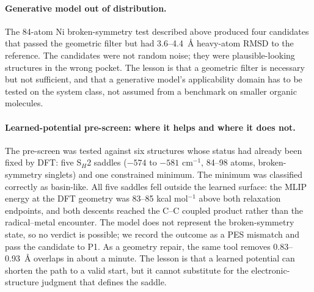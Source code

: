 \documentclass[11pt,a4paper]{article}
\begin{document}
\paragraph{Generative model out of distribution.}
The 84-atom Ni broken-symmetry test described above produced four candidates that passed the geometric filter but had 3.6--4.4~\AA{} heavy-atom RMSD to the reference. The candidates were not random noise; they were plausible-looking structures in the wrong pocket. The lesson is that a geometric filter is necessary but not sufficient, and that a generative model's applicability domain has to be tested on the system class, not assumed from a benchmark on smaller organic molecules.

\paragraph{Learned-potential pre-screen: where it helps and where it does not.}
The pre-screen was tested against six structures whose status had already been fixed by DFT: five S$_H$2 saddles ($-574$ to $-581$ cm$^{-1}$, 84--98 atoms, broken-symmetry singlets) and one constrained minimum. The minimum was classified correctly as basin-like. All five saddles fell outside the learned surface: the MLIP energy at the DFT geometry was 83--85 kcal mol$^{-1}$ above both relaxation endpoints, and both descents reached the C--C coupled product rather than the radical--metal encounter. The model does not represent the broken-symmetry state, so no verdict is possible; we record the outcome as a PES mismatch and pass the candidate to P1. As a geometry repair, the same tool removes 0.83--0.93~\AA{} overlaps in about a minute. The lesson is that a learned potential can shorten the path to a valid start, but it cannot substitute for the electronic-structure judgment that defines the saddle.
\end{document}
